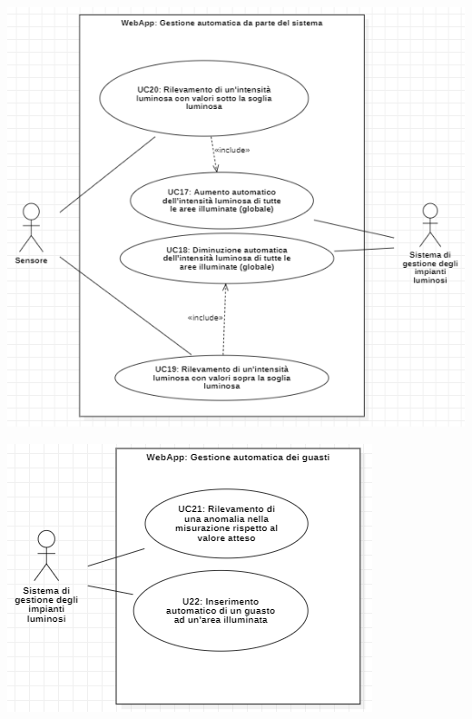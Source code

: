 \documentclass[a4paper, 12pt]{article}
\begin{document}
\includegraphics[scale=0.7]{diagramma_use_case_11.png}

\includegraphics[scale=0.7]{diagramma_use_case_12.png}
\end{document}
